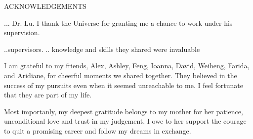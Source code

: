 \newpage
{}

\begin{center}
ACKNOWLEDGEMENTS
\end{center}

... Dr. Lu. I thank the Universe for granting me a chance to work under his supervision.

..supervisors. .. knowledge and skills they shared were invaluable

I am grateful to my friends,  Alex, Ashley, Feng, Ioanna, David, Weiheng,  Farida, and Aridiane, 
 for cheerful moments we shared together. They believed in the success of my  pursuits even when it seemed unreachable to me. I feel fortunate that they are part of my life. 

Most importanly, my deepest gratitude belongs to my mother for her patience, unconditional love and trust in my judgement. %
I owe to her support the courage to quit a promising career and follow my dreams in exchange.
%
%
